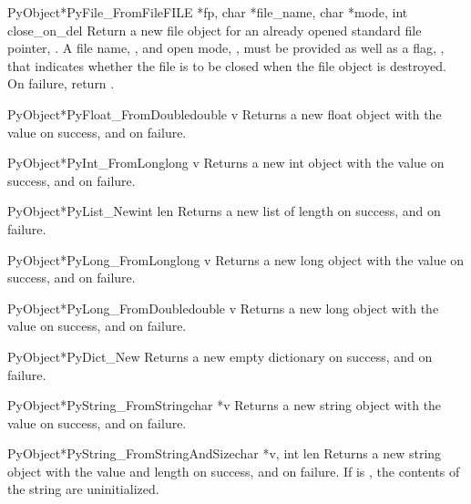 \documentclass{manual}
\begin{document}
\begin{cfuncdesc}{PyObject*}{PyFile_FromFile}{FILE *fp, char *file_name, char *mode, int close_on_del}
Return a new file object for an already opened standard \C{} file
pointer, .  A file name, , and open mode,
, must be provided as well as a flag, ,
that indicates whether the file is to be closed when the file object
is destroyed.  On failure, return .
\end{cfuncdesc}

\begin{cfuncdesc}{PyObject*}{PyFloat_FromDouble}{double v}
Returns a new float object with the value  on success, and
\NULL{} on failure.
\end{cfuncdesc}

\begin{cfuncdesc}{PyObject*}{PyInt_FromLong}{long v}
Returns a new int object with the value  on success, and
\NULL{} on failure.
\end{cfuncdesc}

\begin{cfuncdesc}{PyObject*}{PyList_New}{int len}
Returns a new list of length  on success, and \NULL{} on
failure.
\end{cfuncdesc}

\begin{cfuncdesc}{PyObject*}{PyLong_FromLong}{long v}
Returns a new long object with the value  on success, and
\NULL{} on failure.
\end{cfuncdesc}

\begin{cfuncdesc}{PyObject*}{PyLong_FromDouble}{double v}
Returns a new long object with the value  on success, and
\NULL{} on failure.
\end{cfuncdesc}

\begin{cfuncdesc}{PyObject*}{PyDict_New}{}
Returns a new empty dictionary on success, and \NULL{} on
failure.
\end{cfuncdesc}

\begin{cfuncdesc}{PyObject*}{PyString_FromString}{char *v}
Returns a new string object with the value  on success, and
\NULL{} on failure.
\end{cfuncdesc}

\begin{cfuncdesc}{PyObject*}{PyString_FromStringAndSize}{char *v, int len}
Returns a new string object with the value  and length
 on success, and \NULL{} on failure.  If  is \NULL{},
the contents of the string are uninitialized.
\end{cfuncdesc}
\end{document}
